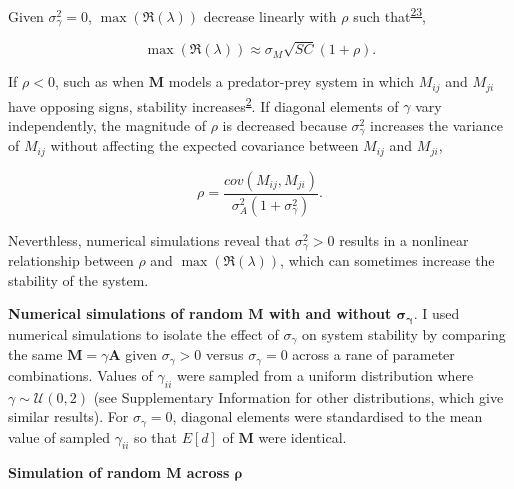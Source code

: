 \documentclass[]{article}
\begin{document}
Given \(\sigma^{2}_\gamma = 0\), \(\max(\Re(\lambda))\) decrease
linearly with \(\rho\) such
that\textsuperscript{\protect\hyperlink{ref-Tang2014c}{23}},

\begin{equation} \label{rho_stab}
\max(\Re(\lambda)) \approx \sigma_{M}\sqrt{SC}\left(1 + \rho\right).
\end{equation}

If \(\rho < 0\), such as when \(\textbf{M}\) models a predator-prey
system in which \(M_{ij}\) and \(M_{ji}\) have opposing signs, stability
increases\textsuperscript{\protect\hyperlink{ref-Allesina2012}{2}}. If
diagonal elements of \(\gamma\) vary independently, the magnitude of
\(\rho\) is decreased because \(\sigma^{2}_{\gamma}\) increases the
variance of \(M_{ij}\) without affecting the expected covariance between
\(M_{ij}\) and \(M_{ji}\),

\begin{equation} \label{rho_def}
\rho = \frac{cov(M_{ij}, M_{ji})}{\sigma^{2}_{A}(1 + \sigma^{2}_{\gamma})}.
\end{equation}

Neverthless, numerical simulations reveal that
\(\sigma^{2}_{\gamma} > 0\) results in a nonlinear relationship between
\(\rho\) and \(\max(\Re(\lambda))\), which can sometimes increase the
stability of the system.

\textbf{Numerical simulations of random \(\mathbf{M}\) with and without
\(\mathbf{\sigma_{\gamma}}\)}. I used numerical simulations to isolate
the effect of \(\sigma_{\gamma}\) on system stability by comparing the
same \(\textbf{M} = \gamma \textbf{A}\) given \(\sigma_{\gamma} > 0\)
versus \(\sigma_{\gamma} = 0\) across a rane of parameter combinations.
Values of \(\gamma_{ii}\) were sampled from a uniform distribution where
\(\gamma \sim \mathcal{U}(0, 2)\) (see Supplementary Information for
other distributions, which give similar results). For
\(\sigma_{\gamma} = 0\), diagonal elements were standardised to the mean
value of sampled \(\gamma_{ii}\) so that \(E[d]\) of \(\textbf{M}\) were
identical.

\textbf{Simulation of random \(\mathbf{M}\) across \(\mathbf{\rho}\)}
\end{document}

